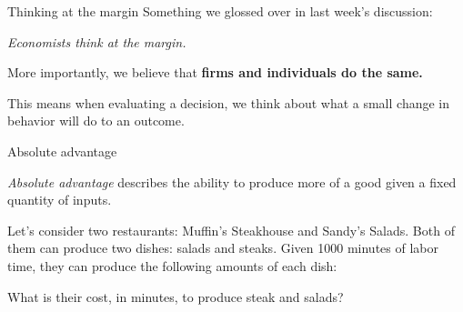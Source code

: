 \documentclass[compress]{beamer}
\begin{document}
\begin{frame}{Thinking at the margin}
Something we glossed over in last week's discussion:

\begin{block}{}
    \begin{center}
        \textit{Economists think at the margin.}
    \end{center}
\end{block}

    More importantly, we believe that \textbf{firms and individuals do the same.
}
    \medskip
    \medskip

    This means when evaluating a decision, we think about what a small change in behavior will do to an outcome.

\end{frame}

\begin{frame}{Absolute advantage}
\begin{block}{}
    \textit{Absolute advantage} describes the ability to produce more of a good given a fixed quantity of inputs.
\end{block}
    \medskip

Let's consider two restaurants: Muffin's Steakhouse and Sandy's Salads. Both of them can produce two dishes: salads and steaks. Given 1000 minutes of labor time, they can produce the following amounts of each dish:

    

    What is their cost, in minutes, to produce steak and salads?
\end{frame} 
\end{document}
